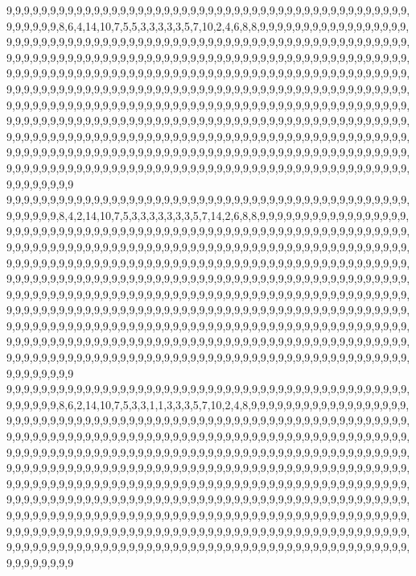 9,9,9,9,9,9,9,9,9,9,9,9,9,9,9,9,9,9,9,9,9,9,9,9,9,9,9,9,9,9,9,9,9,9,9,9,9,9,9,9,9,9,9,9,9,9,9,9,9,9,9,9,8,6,4,14,10,7,5,5,3,3,3,3,3,5,7,10,2,4,6,8,8,9,9,9,9,9,9,9,9,9,9,9,9,9,9,9,9,9,9,9,9,9,9,9,9,9,9,9,9,9,9,9,9,9,9,9,9,9,9,9,9,9,9,9,9,9,9,9,9,9,9,9,9,9,9,9,9,9,9,9,9,9,9,9,9,9,9,9,9,9,9,9,9,9,9,9,9,9,9,9,9,9,9,9,9,9,9,9,9,9,9,9,9,9,9,9,9,9,9,9,9,9,9,9,9,9,9,9,9,9,9,9,9,9,9,9,9,9,9,9,9,9,9,9,9,9,9,9,9,9,9,9,9,9,9,9,9,9,9,9,9,9,9,9,9,9,9,9,9,9,9,9,9,9,9,9,9,9,9,9,9,9,9,9,9,9,9,9,9,9,9,9,9,9,9,9,9,9,9,9,9,9,9,9,9,9,9,9,9,9,9,9,9,9,9,9,9,9,9,9,9,9,9,9,9,9,9,9,9,9,9,9,9,9,9,9,9,9,9,9,9,9,9,9,9,9,9,9,9,9,9,9,9,9,9,9,9,9,9,9,9,9,9,9,9,9,9,9,9,9,9,9,9,9,9,9,9,9,9,9,9,9,9,9,9,9,9,9,9,9,9,9,9,9,9,9,9,9,9,9,9,9,9,9,9,9,9,9,9,9,9,9,9,9,9,9,9,9,9,9,9,9,9,9,9,9,9,9,9,9,9,9,9,9,9,9,9,9,9,9,9,9,9,9,9,9,9,9,9,9,9,9,9,9,9,9,9,9,9,9,9,9,9,9,9,9,9,9,9,9,9,9,9,9,9,9,9,9,9,9,9,9,9,9,9,9,9,9,9,9,9,9,9,9,9,9,9,9,9,9,9,9,9,9,9,9,9,9,9,9,9,9,9,9,9,9,9,9,9,9,9,9,9,9,9,9,9,9,9,9,9,9,9,9,9,9,9,9,9,9,9,9,9,9,9,9,9,9,9,9,9,9,9,9,9,9,9,9,9,9
9,9,9,9,9,9,9,9,9,9,9,9,9,9,9,9,9,9,9,9,9,9,9,9,9,9,9,9,9,9,9,9,9,9,9,9,9,9,9,9,9,9,9,9,9,9,9,9,9,9,9,9,8,4,2,14,10,7,5,3,3,3,3,3,3,3,5,7,14,2,6,8,8,9,9,9,9,9,9,9,9,9,9,9,9,9,9,9,9,9,9,9,9,9,9,9,9,9,9,9,9,9,9,9,9,9,9,9,9,9,9,9,9,9,9,9,9,9,9,9,9,9,9,9,9,9,9,9,9,9,9,9,9,9,9,9,9,9,9,9,9,9,9,9,9,9,9,9,9,9,9,9,9,9,9,9,9,9,9,9,9,9,9,9,9,9,9,9,9,9,9,9,9,9,9,9,9,9,9,9,9,9,9,9,9,9,9,9,9,9,9,9,9,9,9,9,9,9,9,9,9,9,9,9,9,9,9,9,9,9,9,9,9,9,9,9,9,9,9,9,9,9,9,9,9,9,9,9,9,9,9,9,9,9,9,9,9,9,9,9,9,9,9,9,9,9,9,9,9,9,9,9,9,9,9,9,9,9,9,9,9,9,9,9,9,9,9,9,9,9,9,9,9,9,9,9,9,9,9,9,9,9,9,9,9,9,9,9,9,9,9,9,9,9,9,9,9,9,9,9,9,9,9,9,9,9,9,9,9,9,9,9,9,9,9,9,9,9,9,9,9,9,9,9,9,9,9,9,9,9,9,9,9,9,9,9,9,9,9,9,9,9,9,9,9,9,9,9,9,9,9,9,9,9,9,9,9,9,9,9,9,9,9,9,9,9,9,9,9,9,9,9,9,9,9,9,9,9,9,9,9,9,9,9,9,9,9,9,9,9,9,9,9,9,9,9,9,9,9,9,9,9,9,9,9,9,9,9,9,9,9,9,9,9,9,9,9,9,9,9,9,9,9,9,9,9,9,9,9,9,9,9,9,9,9,9,9,9,9,9,9,9,9,9,9,9,9,9,9,9,9,9,9,9,9,9,9,9,9,9,9,9,9,9,9,9,9,9,9,9,9,9,9,9,9,9,9,9,9,9,9,9,9,9,9,9,9,9,9,9,9,9,9,9,9,9,9,9,9,9,9,9,9,9,9,9,9,9,9,9,9,9
9,9,9,9,9,9,9,9,9,9,9,9,9,9,9,9,9,9,9,9,9,9,9,9,9,9,9,9,9,9,9,9,9,9,9,9,9,9,9,9,9,9,9,9,9,9,9,9,9,9,9,9,8,6,2,14,10,7,5,3,3,1,1,3,3,3,5,7,10,2,4,8,9,9,9,9,9,9,9,9,9,9,9,9,9,9,9,9,9,9,9,9,9,9,9,9,9,9,9,9,9,9,9,9,9,9,9,9,9,9,9,9,9,9,9,9,9,9,9,9,9,9,9,9,9,9,9,9,9,9,9,9,9,9,9,9,9,9,9,9,9,9,9,9,9,9,9,9,9,9,9,9,9,9,9,9,9,9,9,9,9,9,9,9,9,9,9,9,9,9,9,9,9,9,9,9,9,9,9,9,9,9,9,9,9,9,9,9,9,9,9,9,9,9,9,9,9,9,9,9,9,9,9,9,9,9,9,9,9,9,9,9,9,9,9,9,9,9,9,9,9,9,9,9,9,9,9,9,9,9,9,9,9,9,9,9,9,9,9,9,9,9,9,9,9,9,9,9,9,9,9,9,9,9,9,9,9,9,9,9,9,9,9,9,9,9,9,9,9,9,9,9,9,9,9,9,9,9,9,9,9,9,9,9,9,9,9,9,9,9,9,9,9,9,9,9,9,9,9,9,9,9,9,9,9,9,9,9,9,9,9,9,9,9,9,9,9,9,9,9,9,9,9,9,9,9,9,9,9,9,9,9,9,9,9,9,9,9,9,9,9,9,9,9,9,9,9,9,9,9,9,9,9,9,9,9,9,9,9,9,9,9,9,9,9,9,9,9,9,9,9,9,9,9,9,9,9,9,9,9,9,9,9,9,9,9,9,9,9,9,9,9,9,9,9,9,9,9,9,9,9,9,9,9,9,9,9,9,9,9,9,9,9,9,9,9,9,9,9,9,9,9,9,9,9,9,9,9,9,9,9,9,9,9,9,9,9,9,9,9,9,9,9,9,9,9,9,9,9,9,9,9,9,9,9,9,9,9,9,9,9,9,9,9,9,9,9,9,9,9,9,9,9,9,9,9,9,9,9,9,9,9,9,9,9,9,9,9,9,9,9,9,9,9,9,9,9,9,9,9,9,9,9,9,9,9,9,9,9,9,9,9
